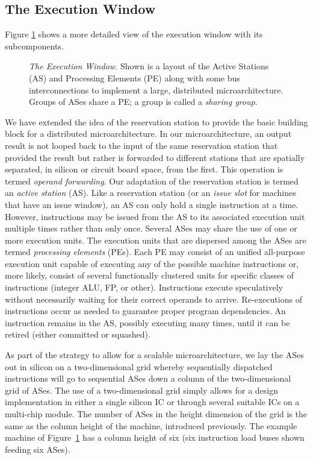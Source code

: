 \documentclass[10pt,twocolumn,dvips]{article}
\begin{document}
\subsection{The Execution Window}
%
Figure \ref{fig:window} shows a more detailed view
of the execution window with its subcomponents.
%
\begin{figure}
\centering
{}
\caption{{\em The Execution Window.} 
Shown is a layout of the Active Stations (AS) and Processing Elements (PE)
along with some bus interconnections to implement a large,
distributed microarchitecture. Groups of ASes share a PE; a group is called
a {\em sharing group}.}
\label{fig:window}
\end{figure}
%
We have extended the idea of the reservation
station \cite{Tom67} to provide the basic building block for a distributed
microarchitecture.  
In our microarchitecture,
an output result is not looped back to the input of the same reservation
station
that provided the result but rather is forwarded to different
stations that are spatially separated, in silicon or circuit board space,
from the first.  
This operation is termed {\em operand forwarding}.
Our adaptation of the
reservation station is termed an {\em active station} (AS).
Like a reservation station (or an {\em issue slot} for machines
that have an issue window), an AS can only hold a single
instruction at a time.  
However, instructions may be issued from the AS to its associated execution 
unit multiple times rather than only once.  
Several ASes may share the use of one or more execution units.
The execution units that are dispersed among the ASes are termed
{\em processing elements} (PEs).  Each PE 
may consist of an unified all-purpose execution unit capable of
executing any of the possible machine instructions or, more likely,
consist of
several functionally clustered units
for specific classes of instructions (integer ALU, FP, or other).
Instructions execute
speculatively without necessarily waiting for their correct
operands to arrive.  Re-executions of instructions occur as needed
to guarantee proper program dependencies.
An instruction remains in the AS, possibly executing many times,
until it can be retired (either committed or squashed).

As part of the strategy to allow for a scalable microarchitecture,
we lay the ASes out in silicon on
a two-dimensional grid whereby sequentially
dispatched instructions will go to sequential ASes down a column of
the two-dimensional grid of ASes.  
The use of a two-dimensional
grid simply allows for a design implementation
in either a single silicon IC or through several
suitable ICs on a multi-chip module.
The number of ASes in the height dimension of the grid is the
same as the column height of the machine, introduced previously.
The example machine of Figure~\ref{fig:window} has a column height of
six (six instruction load buses shown feeding six ASes). 
\end{document}
